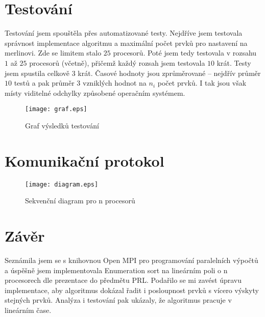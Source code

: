 \documentclass[11pt]{article}
\begin{document}
\section{Testování}
Testování jsem spouštěla přes automatizované testy.
Nejdříve jsem testovala správnost implementace algoritmu a maximální počet prvků pro nastavení na merlinovi. Zde se limitem stalo $25$ procesorů.
Poté jsem tedy testovala v rozsahu $1$ až $25$ procesorů (včetně), přičemž každý rozsah jsem testovala $10$ krát. 
Testy jsem spustila celkově $3$ krát.
Časové hodnoty jsou zprůměrované -- nejdřív průměr $10$ testů a pak průměr $3$ vzniklých hodnot na $n_i$ počet prvků. I tak jsou však místy viditelné odchylky způsobené operačním systémem.

\begin{figure}[h]
\centering
\texttt{[image: graf.eps]}
\caption{Graf výsledků testování}
\end{figure}

\newpage
\section{Komunikační protokol}
\begin{figure}[h]
\centering
\texttt{[image: diagram.eps]}
\caption{Sekvenční diagram pro n procesorů}
\end{figure}

\section{Závěr}
Seznámila jsem se s knihovnou Open MPI pro programování paralelních výpočtů a úspěšně jsem implementovala Enumeration sort na lineárním poli o n procesorech dle prezentace do předmětu PRL.
Podařilo se mi zavést úpravu implementace, aby algoritmus dokázal řadit i posloupnost prvků s vícero výskyty stejných prvků.
Analýza i testování pak ukázaly, že algoritmus pracuje v lineárním čase.
\end{document}
